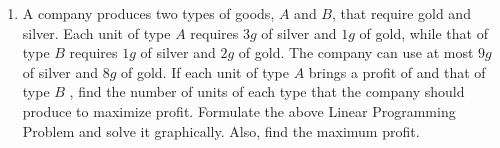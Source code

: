 \begin{enumerate}
\item A company produces two types of goods, $A$ and $B$, that require gold and silver. Each unit of type $A$ requires $3g$ of silver and $1g$ of gold, while that of type $B$ requires $1g$ of silver and $2g$ of gold. The company can use at most $9g$ of silver and $8g$ of gold. If each unit of type $A$ brings a profit of  and that of type $B$ , find the number of units of each type that the company should produce to maximize profit. Formulate the above Linear Programming Problem  and solve it graphically. Also, find the maximum profit.       
\end{enumerate}

